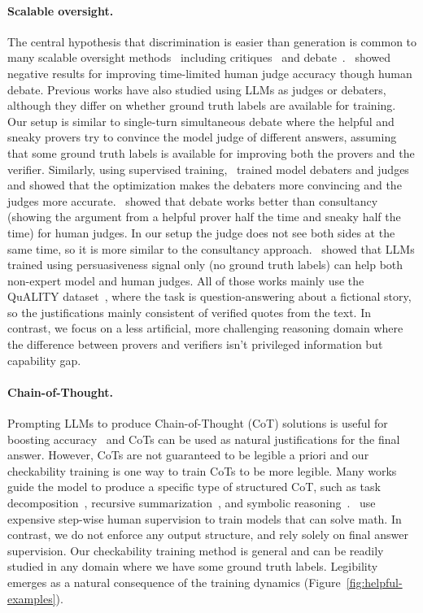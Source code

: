 \documentclass{article}
\begin{document}
\paragraph{Scalable oversight.}
The central hypothesis that discrimination is easier than generation is common to many scalable oversight methods~\citep{bowman2022measuring} including critiques~\citep{saunders2022self,mcaleese2024llm} and debate~\citep{irving2018ai}.~\citet{parrish2022two} showed negative results for improving time-limited human judge accuracy though human debate. Previous works have also studied using LLMs as judges or debaters, although they differ on whether ground truth labels are available for training. Our setup is similar to single-turn simultaneous debate where the helpful and sneaky provers try to convince the model judge of different answers, assuming that some ground truth labels is available for improving both the provers and the verifier. Similarly, using supervised training,~\citet{Radhakrishnan2023} trained model debaters and judges and showed that the optimization makes the debaters more convincing and the judges more accurate.~\citet{michael2023debate} showed that debate works better than consultancy (showing the argument from a helpful prover half the time and sneaky half the time) for human judges. In our setup the judge does not see both sides at the same time, so it is more similar to the consultancy approach.~\citet{khan2024debating} showed that LLMs trained using persuasiveness signal only (no ground truth labels) can help both non-expert model and human judges. All of those works mainly use the QuALITY dataset~\citep{pang-etal-2022-quality}, where the task is question-answering about a fictional story, so the justifications mainly consistent of verified quotes from the text. In contrast, we focus on a less artificial, more challenging reasoning domain where the difference between provers and verifiers isn't privileged information but capability gap.

\paragraph{Chain-of-Thought.}
Prompting LLMs to produce Chain-of-Thought (CoT) solutions is useful for boosting accuracy~\citep{wei2022chain} and CoTs can be used as natural justifications for the final answer. 
However, CoTs are not guaranteed to be legible a priori and our checkability training is one way to train CoTs to be more legible. Many works guide the model to produce a specific type of structured CoT, such as task decomposition~\citep{christiano2018supervising, radhakrishnan2023question,wen2024learning}, recursive summarization~\citep{wu2021recursively}, and symbolic reasoning~\citep{lyu-etal-2023-faithful}.~\citet{lightman2024lets} use expensive step-wise human supervision to train models that can solve math. In contrast, we do not enforce any output structure, and rely solely on final answer supervision. Our checkability training method is general and can be readily studied in any domain where we have some ground truth labels. Legibility emerges as a natural consequence of the training dynamics (Figure~\ref{fig:helpful-examples}).
\end{document}
